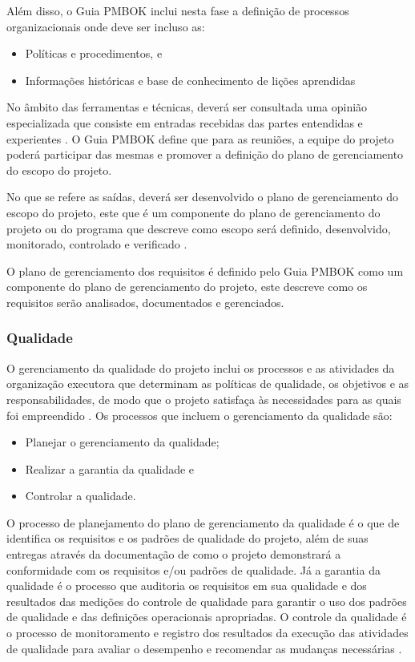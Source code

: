 \documentclass{acm_proc_article-sp}
\begin{document}
Além disso, o  Guia PMBOK inclui nesta fase a definição de processos organizacionais onde deve ser incluso as:

\begin{itemize}
\item Políticas e procedimentos, e
\item Informações históricas e base de conhecimento de lições aprendidas
\end{itemize}

No âmbito das ferramentas e técnicas, deverá ser consultada uma opinião especializada que consiste em entradas recebidas das partes entendidas e experientes \cite{pmbok:nAgil}. O Guia PMBOK define que para as reuniões, a equipe do projeto poderá participar das mesmas e promover a definição do plano de gerenciamento do escopo do projeto.

No que se refere as saídas, deverá ser desenvolvido o plano de gerenciamento do escopo do projeto, este que é um componente do plano de gerenciamento do projeto ou do programa que descreve como escopo será definido, desenvolvido, monitorado, controlado e verificado \cite{pmbok:nAgil}.

O plano de gerenciamento dos requisitos é definido pelo Guia PMBOK como um componente do plano de gerenciamento do projeto, este descreve como os requisitos serão analisados, documentados e gerenciados. 

\subsubsection*{Qualidade}
O gerenciamento da qualidade do projeto inclui os processos e as atividades da organização executora que determinam as políticas de qualidade, os objetivos e as responsabilidades, de modo que o projeto satisfaça às necessidades para as quais foi empreendido  \cite{pmbok:nAgil}. Os processos que incluem o gerenciamento da qualidade são:

\begin{itemize}
\item Planejar o gerenciamento da qualidade;
\item Realizar a garantia da qualidade e
\item Controlar a qualidade.
\end{itemize}

O processo de planejamento do plano de gerenciamento da qualidade é o que de identifica os requisitos e os padrões de qualidade do projeto, além de suas entregas através da documentação de como o projeto demonstrará a conformidade com os requisitos e/ou padrões de qualidade. Já a garantia da qualidade é o processo que auditoria os requisitos em sua qualidade e dos resultados das medições do controle de qualidade para garantir o uso dos padrões de qualidade e das definições operacionais apropriadas. O controle da qualidade é o processo de monitoramento e registro dos resultados da execução das atividades de qualidade para avaliar o desempenho e recomendar as mudanças necessárias \cite{pmbok:nAgil}.
\end{document}

